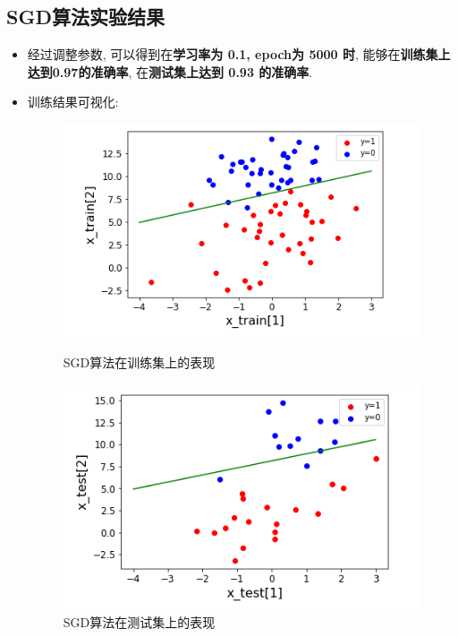 \documentclass[UTF8]{article}
\begin{document}
\subsection{SGD算法实验结果}
\begin{itemize}
	\item 经过调整参数, 可以得到在\textbf{学习率为 0.1, epoch为 5000 时}, 能够在\textbf{训练集上达到0.97的准确率}, 在\textbf{测试集上达到 0.93 的准确率}.
	\item 训练结果可视化:
	\begin{figure}[H]
		\begin{minipage}[H]{0.5\linewidth}
			\centering
			\includegraphics[width=\linewidth]{sgd_train.png}
			\caption{SGD算法在训练集上的表现}
		\end{minipage}
		\begin{minipage}[H]{0.5\linewidth}
			\centering
			\includegraphics[width=\linewidth]{sgd_test.png}
			\caption{SGD算法在测试集上的表现}
		\end{minipage}
	\end{figure}
\end{itemize}
\end{document}
